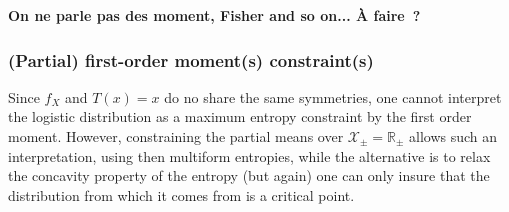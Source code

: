 \documentclass[entropy,article,submit,moreauthors,pdftex]{Definitions/mdpi}
\newcommand{\SZ}[1]{{\color{blue} #1}}                                       %
\newcommand{\Avoir}[1]{{\color{red}\bf #1}}                                  %
\def\Rset{\mathbb{R}}%
\def\X{\mathcal{X}}%
\begin{document}
\Avoir{On ne parle pas des moment, Fisher and so on... \`A faire~?}




\subsubsection{(Partial) first-order moment(s) constraint(s)}
\label{subsubsecapp:LogisticFirstPartial}

Since $f_X$ and $T(x) = x$ do no share the same symmetries, one cannot interpret
the logistic  distribution as a  maximum entropy  constraint by the  first order
moment. However, constraining the partial means over $\X_\pm = \Rset_\pm$ allows
such an interpretation, using then multiform entropies, while the alternative is
to relax  the concavity  property of  the entropy \SZ{(but  again) one  can only
  insure that the  distribution from which it comes from  is a critical point}.
\end{document}
